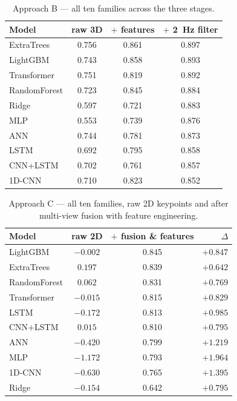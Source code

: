 \begin{table}[H]
\centering
\caption{Approach B --- all ten families across the three stages.}
\label{tab:app:B}
\small
\begin{tabular}{@{}lccc@{}}
\toprule
\textbf{Model} & \textbf{raw 3D} & \textbf{$+$ features} &
\textbf{$+$ \SI{2}{\hertz} filter} \\
\midrule
ExtraTrees   & 0.756 & 0.861 & 0.897 \\
LightGBM     & 0.743 & 0.858 & 0.893 \\
Transformer  & 0.751 & 0.819 & 0.892 \\
RandomForest & 0.723 & 0.845 & 0.884 \\
Ridge        & 0.597 & 0.721 & 0.883 \\
MLP          & 0.553 & 0.739 & 0.876 \\
ANN          & 0.744 & 0.781 & 0.873 \\
LSTM         & 0.692 & 0.795 & 0.858 \\
CNN+LSTM     & 0.702 & 0.761 & 0.857 \\
1D-CNN       & 0.710 & 0.823 & 0.852 \\
\bottomrule
\end{tabular}
\end{table}

\begin{table}[H]
\centering
\caption{Approach C --- all ten families, raw 2D keypoints and after multi-view
fusion with feature engineering.}
\label{tab:app:C}
\small
\begin{tabular}{@{}lccr@{}}
\toprule
\textbf{Model} & \textbf{raw 2D} & \textbf{$+$ fusion \& features} &
\textbf{$\Delta$} \\
\midrule
LightGBM     & $-0.002$ & 0.845 & $+0.847$ \\
ExtraTrees   & $0.197$  & 0.839 & $+0.642$ \\
RandomForest & $0.062$  & 0.831 & $+0.769$ \\
Transformer  & $-0.015$ & 0.815 & $+0.829$ \\
LSTM         & $-0.172$ & 0.813 & $+0.985$ \\
CNN+LSTM     & $0.015$  & 0.810 & $+0.795$ \\
ANN          & $-0.420$ & 0.799 & $+1.219$ \\
MLP          & $-1.172$ & 0.793 & $+1.964$ \\
1D-CNN       & $-0.630$ & 0.765 & $+1.395$ \\
Ridge        & $-0.154$ & 0.642 & $+0.795$ \\
\bottomrule
\end{tabular}
\end{table}

